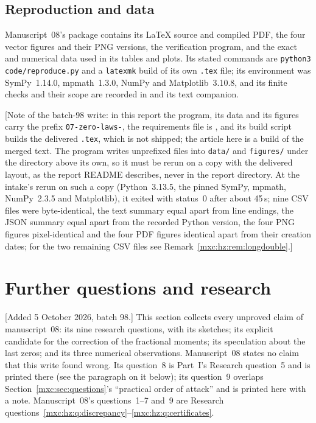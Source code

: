 \documentclass[11pt]{article}
\numberwithin{equation}{section}
\theoremstyle{definition}
\theoremstyle{remark}
\begin{document}
\subsection{Reproduction and data}

Manuscript~08's package contains its \LaTeX{} source and compiled PDF, the
four vector figures and their PNG versions, the verification program, and
the exact and numerical data used in its tables and plots. Its stated
commands are \texttt{python3 code/reproduce.py} and a \texttt{latexmk}
build of its own \texttt{.tex} file; its environment was SymPy~1.14.0,
mpmath~1.3.0, NumPy and Matplotlib~3.10.8, and its finite checks and their
scope are recorded in 
and its text companion.

[Note of the batch-98 write: in this report the program, its data and its
figures carry the prefix \texttt{07-zero-laws-}, the requirements file is
, and its build script
 builds the delivered \texttt{.tex}, which is
not shipped; the article here is a build of the merged text. The program
writes unprefixed files into \texttt{data/} and \texttt{figures/} under the
directory above its own, so it must be rerun on a copy with the delivered
layout, as the report README describes, never in the report directory. At
the intake's rerun on such a copy (Python~3.13.5, the pinned SymPy,
mpmath, NumPy~2.3.5 and Matplotlib), it exited with status~0 after about
45\,s; nine CSV files were byte-identical, the text summary equal apart from
line endings, the JSON summary equal apart from the recorded Python version,
the four PNG figures pixel-identical and the four PDF figures identical
apart from their creation dates; for the two remaining CSV files see
Remark~\ref{mxc:hz:rem:longdouble}.]

\section{Further questions and research}\label{mxc:hz:sec:questions}

[Added 5 October 2026, batch 98.] This section collects every unproved
claim of manuscript~08: its nine research questions, with its sketches;
its explicit candidate for the correction of the fractional moments; its
speculation about the last zeros; and its three numerical observations.
Manuscript~08 states no claim that this write found wrong. Its question~8
is Part~I's Research question~5 and is printed there (see the paragraph
on it below); its question~9 overlaps
Section~\ref{mxc:sec:questions}'s ``practical order of attack'' and is
printed here with a note. Manuscript~08's questions~1--7 and~9 are
Research questions~\ref{mxc:hz:q:discrepancy}--\ref{mxc:hz:q:certificates}.
\end{document}
